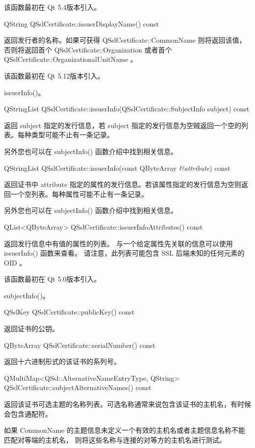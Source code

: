 该函数最初在 Qt 5.4版本引入。

QString QSslCertificate::issuerDisplayName() const

返回发行者的名称。如果可获得 QSslCertificate::CommonName 则将返回该值，
否则将返回首个 QSslCertificate::Organization
 或者首个 QSslCertificate::OrganizationalUnitName 。

该函数最初在 Qt 5.12版本引入。

\begin{seeAlso}
issuerInfo()。
\end{seeAlso}

QStringList QSslCertificate::issuerInfo(QSslCertificate::SubjectInfo subject) const

返回 subject 指定的发行信息，若 subject 指定的发行信息为空贼返回一个空的列表。每种类型可能不止有一条记录。

另外您也可以在 subjectInfo() 函数介绍中找到相关信息。

QStringList QSslCertificate::issuerInfo(const QByteArray \emph{\&attribute}) const

返回证书中 attribute 指定的属性的发行信息。若该属性指定的发行信息为空则返回一个空列表。每种属性可能不止有一条记录。

另外您也可以在 subjectInfo() 函数介绍中找到相关信息。

QList<QByteArray> QSslCertificate::issuerInfoAttributes() const

返回发行信息中有值的属性的列表。
与一个给定属性先关联的信息可以使用 issuerInfo() 函数来查看。
请注意，此列表可能包含 SSL 后端未知的任何元素的 OID 。

该函数最初在 Qt 5.0版本引入。

\begin{seeAlso}
subjectInfo()。
\end{seeAlso}

QSslKey QSslCertificate::publicKey() const

返回证书的公钥。

QByteArray QSslCertificate::serialNumber() const

返回十六进制形式的该证书的系列号。

QMultiMap<QSsl::AlternativeNameEntryType, QString> QSslCertificate::subjectAlternativeNames() const

返回该证书可选主题的名称列表。可选名称通常来说包含该证书的主机名，有时候会包含通配符。

如果 CommonName 的主题信息未定义一个有效的主机名或者主题信息名称不能匹配对等端的主机名，
则将这些名称与连接的对等方的主机名进行测试。

